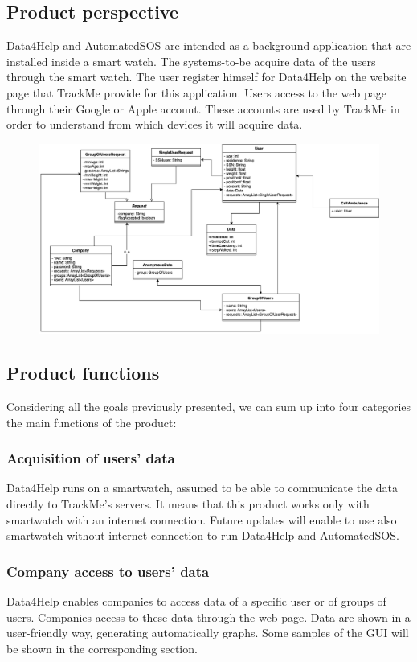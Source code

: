 \documentclass{article}
\begin{document}
\subsection{Product perspective}
Data4Help and AutomatedSOS are intended as a background application that are installed inside a smart watch. The systems-to-be acquire data of the users through the smart watch. The user register himself for Data4Help on the website page that TrackMe provide for this application. Users access to the web page through their Google or Apple account. These accounts are used by TrackMe in order to understand from which devices it will acquire data.
\begin{figure}[h!]
\centering
    \textbf{}\par\medskip
	\includegraphics[width= \linewidth]{model.png}
\end{figure}
\subsection{Product functions}
Considering all the goals previously presented, we can sum up into four categories the main functions of the product:
\subsubsection{Acquisition of users' data}
Data4Help runs on a smartwatch, assumed to be able to communicate the data directly to TrackMe's servers. It means that this product works only with smartwatch with an internet connection. Future updates will enable to use also smartwatch without internet connection to run Data4Help and AutomatedSOS.
\subsubsection{Company access to users' data}
Data4Help enables companies to access data of a specific user or of groups of users. Companies access to these data through the web page. Data are shown in a user-friendly way, generating automatically graphs. Some samples of the GUI will be shown in the corresponding section.
\end{document}
